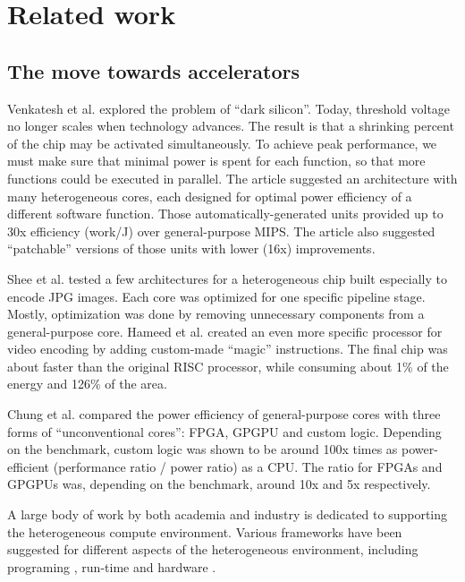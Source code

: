 \documentclass[twocolumn,english]{IEEEtran}
\begin{document}
\section{Related work}


\subsection*{The move towards accelerators}

Venkatesh et al. \cite{ConservationC} explored the problem of {}``dark
silicon''. Today, threshold voltage no longer scales when technology
advances. The result is that a shrinking percent of the chip may be
activated simultaneously. To achieve peak performance, we must make
sure that minimal power is spent for each function, so that more functions
could be executed in parallel. The article suggested an architecture
with many heterogeneous cores, each designed for optimal power efficiency
of a different software function. Those automatically-generated units
provided up to 30x efficiency (work/J) over general-purpose MIPS.
The article also suggested {}``patchable'' versions of those units
with lower (16x) improvements.

Shee et al. \cite{Shee08} tested a few architectures for a heterogeneous
chip built especially to encode JPG images. Each core was optimized
for one specific pipeline stage. Mostly, optimization was done by
removing unnecessary components from a general-purpose core. Hameed
et al. \cite{Understanding-1} created an even more specific processor
for video encoding by adding custom-made {}``magic'' instructions.
The final chip was about  faster than the original RISC
processor, while consuming about 1\% of the energy and 126\% of the
area.

Chung et al. \cite{Single-ChipHe} compared the power efficiency of
general-purpose cores with three forms of {}``unconventional cores'':
FPGA, GPGPU and custom logic. Depending on the benchmark, custom logic
was shown to be around 100x times as power-efficient (performance
ratio / power ratio) as a CPU. The ratio for FPGAs and GPGPUs was,
depending on the benchmark, around 10x and 5x respectively.

A large body of work by both academia and industry is dedicated to
supporting the heterogeneous compute environment. Various frameworks
have been suggested for different aspects of the heterogeneous environment,
including programing \cite{OpenCL-slides}, run-time \cite{StarPU:Aunif}
and hardware \cite{AcceleratorStore}. 
\end{document}
